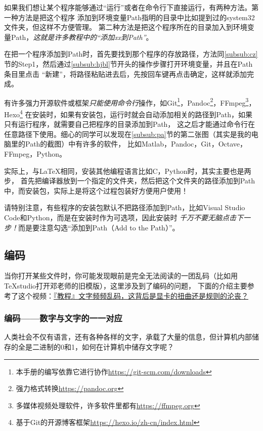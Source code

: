 如果我们想让某个程序能够通过“运行”或者在命令行下直接运行，有两种方法。第一种方法是把这个程序
添加到环境变量Path指明的目录中比如提到过的system32文件夹，但这样不方便管理。
第二种方法是把这个程序所在的目录加入到环境变量Path，\emph{这就是许多教程中的“添加xx到Path”}。

在把一个程序添加到Path时，首先要找到那个程序的存放路径，方法同\ref{subsub:cz}节的Step1，然后通过\ref{subsub:hjbl}节开头的操作步骤打开环境变量，并且在Path条目里点击
“新建”，将路径粘贴进去后，先按回车键再点击确定，这样就添加完成。

有许多强力开源软件或框架\emph{只能使用命令行}操作，如Git\footnote{本手册的编写依靠它进行协作\url{https://git-scm.com/downloads}}，Pandoc\footnote{强力格式转换\url{https://pandoc.org}}，FFmpeg\footnote{多媒体视频处理软件，许多软件里都有\url{https://ffmpeg.org}}，
Hexo\footnote{基于Git的开源博客框架\url{https://hexo.io/zh-cn/index.html}}
在安装时，如果有安装包，运行时就会自动添加相关的路径到Path，如果只有运行程序，就需要自己把程序的目录添加到Path，
这之后才能通过命令行在任意路径下使用。细心的同学可以发现在\ref{subsub:pa}节的第二张图（其实是我的电脑里的Path的截图）中有许多的软件，
比如Matlab，Pandoc，Git，Octave，FFmpeg，Python。

实际上，与\LaTeX{}相同，安装其他编程语言比如C，Python时，其实主要也是两步，
首先把编译器放到一个指定的文件夹，然后把这个文件夹的路径添加到Path中，而安装包，实际上是将这个过程包装好方便用户使用！

请特别注意，有些程序的安装包默认不把路径添加到Path，比如Visual Studio Code和Python，而是在安装时作为可选项，因此安装时
\emph{千万不要无脑点击下一步！}而是要注意勾选“添加到Path（Add to the Path）”。


\subsection{编码}\label{bm}


当你打开某些文件时，你可能发现眼前是完全无法阅读的一团乱码（比如用TeXstudio打开邓老师的旧模版），这里涉及到了编码的问题，
下面的介绍主要参考了这个视频：\href{https://www.bilibili.com/video/BV1ai4y1x7Uz?spm_id_from=333.999.0.0}{『教程』文字频频乱码，这背后是显卡的扭曲还是规则的沦丧？}



\subsubsection{编码——数字与文字的一一对应}


人类社会不仅有语言，还有各种各样的文字，承载了大量的信息，但计算机内部储存的全是二进制的0和1，如何在计算机中储存文字呢？

